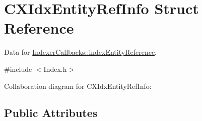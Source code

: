 \hypertarget{structCXIdxEntityRefInfo}{}\section{C\+X\+Idx\+Entity\+Ref\+Info Struct Reference}
\label{structCXIdxEntityRefInfo}


Data for \hyperlink{structIndexerCallbacks_a6d93809e7743a590beafa0387ac145dc}{Indexer\+Callbacks\+::index\+Entity\+Reference}.  




{\ttfamily \#include $<$Index.\+h$>$}



Collaboration diagram for C\+X\+Idx\+Entity\+Ref\+Info\+:
\subsection*{Public Attributes}
